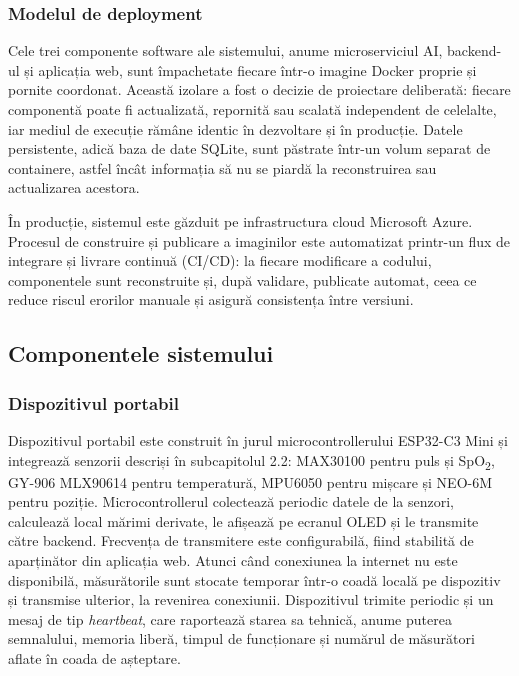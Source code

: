 ﻿\documentclass[12pt,a4paper,twoside]{article}
\newcommand{\spo}{SpO\textsubscript{2}}
\begin{document}
\subsubsection{Modelul de deployment}

Cele trei componente software ale sistemului, anume microserviciul AI, backend-ul și aplicația web, sunt împachetate fiecare într-o imagine Docker proprie și pornite coordonat. Această izolare a fost o decizie de proiectare deliberată: fiecare componentă poate fi actualizată, repornită sau scalată independent de celelalte, iar mediul de execuție rămâne identic în dezvoltare și în producție. Datele persistente, adică baza de date SQLite, sunt păstrate într-un volum separat de containere, astfel încât informația să nu se piardă la reconstruirea sau actualizarea acestora.

În producție, sistemul este găzduit pe infrastructura cloud Microsoft Azure. Procesul de construire și publicare a imaginilor este automatizat printr-un flux de integrare și livrare continuă (CI/CD): la fiecare modificare a codului, componentele sunt reconstruite și, după validare, publicate automat, ceea ce reduce riscul erorilor manuale și asigură consistența între versiuni.

\subsection{Componentele sistemului}

\subsubsection{Dispozitivul portabil}

Dispozitivul portabil este construit în jurul microcontrollerului ESP32-C3 Mini și integrează senzorii descriși în subcapitolul 2.2: MAX30100 pentru puls și \spo, GY-906 MLX90614 pentru temperatură, MPU6050 pentru mișcare și NEO-6M pentru poziție. Microcontrollerul colectează periodic datele de la senzori, calculează local mărimi derivate, le afișează pe ecranul OLED și le transmite către backend. Frecvența de transmitere este configurabilă, fiind stabilită de aparținător din aplicația web. Atunci când conexiunea la internet nu este disponibilă, măsurătorile sunt stocate temporar într-o coadă locală pe dispozitiv și transmise ulterior, la revenirea conexiunii. Dispozitivul trimite periodic și un mesaj de tip \textit{heartbeat}, care raportează starea sa tehnică, anume puterea semnalului, memoria liberă, timpul de funcționare și numărul de măsurători aflate în coada de așteptare.
\end{document}

